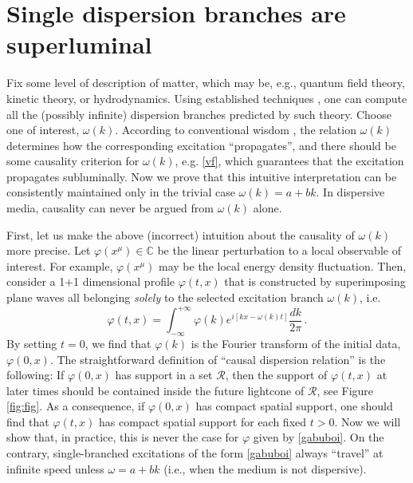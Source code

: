 \documentclass[prl, amsfonts, amssymb, amsmath, nofootinbib,reprint, showkeys, twoside,notitlepage]{revtex4-2}
\theoremstyle{definition}
\theoremstyle{theorem}
\theoremstyle{corollary}
\begin{document}
\section{Single dispersion branches are superluminal} 
Fix some level of description of matter, which may be, e.g., quantum field theory, kinetic theory, or hydrodynamics. Using established techniques \cite{Birmingham2002,KovtunHolography2005,Kovtun2019,Perna2021}, one can compute all the (possibly infinite) dispersion branches predicted by such theory. Choose one of interest, $\omega(k)$. According to conventional wisdom \cite{Brillouin_book,DenicolKodamaMota2008,Koide2011,FoxKuper1970,Krotscheck1978,Pu2010}, the relation $\omega(k)$ determines how the corresponding excitation ``propagates'', and there should be some causality criterion for $\omega(k)$, e.g. \eqref{vf}, which guarantees that the excitation propagates subluminally. Now we prove that this intuitive interpretation can be consistently maintained only in the trivial case $\omega(k) =a+bk$. In dispersive media, causality can never be argued from $\omega(k)$ alone.

First, let us make the above (incorrect) intuition about the causality of $\omega(k)$ more precise.
Let $\varphi(x^\mu)\in \mathbb{C}$ be the linear perturbation to a local observable of interest. For example, $\varphi(x^\mu)$ may be the local energy density fluctuation. Then, consider a 1+1 dimensional profile $\varphi(t,x)$ that is constructed by superimposing plane waves all belonging \textit{solely} to the selected excitation branch $\omega(k)$, i.e.
\begin{equation}\label{gabuboi}
\varphi(t,x)= \int_{-\infty}^{+\infty} \varphi(k) e^{i[kx-\omega(k)t]} \dfrac{dk}{2\pi} \, .
\end{equation}
By setting $t=0$, we find that $\varphi(k)$ is the Fourier transform of the initial data, $\varphi(0,x)$.
The straightforward definition of ``causal dispersion relation'' is the following: If $\varphi(0,x)$ has support in a set $\mathcal{R}$, then the support of $\varphi(t,x)$ at later times should be contained inside the future lightcone of $\mathcal{R}$, see Figure \ref{fig:fig}. As a consequence, if $\varphi(0,x)$ has compact spatial support, one should find that $\varphi(t,x)$ has compact spatial support for each fixed $t>0$. Now we will show that, in practice, this is never the case for $\varphi$ given by \eqref{gabuboi}. On the contrary, single-branched excitations of the form \eqref{gabuboi} always ``travel'' at infinite speed unless $\omega{=}a{+}bk$ (i.e., when the medium is not dispersive).
\end{document}

